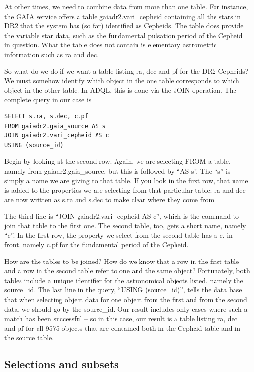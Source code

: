 \documentclass[twocolumn,apj]{openjournal}
\begin{document}
At other times, we need to combine data from more than one table. For instance, the GAIA service offers a table gaiadr2.vari\_cepheid containing all the stars in DR2 that the system has (so far) identified as Cepheids. The table does provide the variable star data, such as the fundamental pulsation period of the Cepheid in question. What the table does not contain is elementary astrometric information such as ra and dec.

So what do we do if we want a table listing ra, dec and pf for the DR2 Cepheids? We must somehow identify which object in the one table corresponds to which object in the other table. In ADQL, this is done via the JOIN operation. The complete query in our case is
\begin{lstlisting}
SELECT s.ra, s.dec, c.pf
FROM gaiadr2.gaia_source AS s
JOIN gaiadr2.vari_cepheid AS c
USING (source_id)
\end{lstlisting}
Begin by looking at the second row. Again, we are selecting FROM a table, namely from gaiadr2.gaia\_source, but this is followed by ``AS s''. The ``s'' is simply a name we are giving to that table. If you look in the first row, that name is added to the properties we are selecting from that particular table: ra and dec are now written as s.ra and s.dec to make clear where they come from.

The third line is ``JOIN gaiadr2.vari\_cepheid AS c'', which is the command to join that table to the first one. The second table, too, gets a short name, namely ``c''. In the first row, the property we select from the second table has a c. in front, namely c.pf for the fundamental period of the Cepheid.

How are the tables to be joined? How do we know that a row in the first table and a row in the second table refer to one and the same object? Fortunately, both tables include a unique identifier for the astronomical objects listed, namely the source\_id. The last line in the query, ``USING (source\_id)'', tells the data base that when selecting object data for one object from the first and from the second data, we should go by the source\_id. Our result includes only cases where such a match has been successful -- so in this case, our result is a table listing ra, dec and pf for all 9575 objects that are contained both in the Cepheid table and in the source table.

\subsection{Selections and subsets}
\label{TOPCATSubsets}
\end{document}
